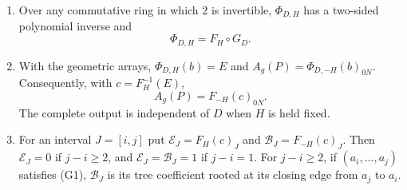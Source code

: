 \begin{lemma}\label{lem:farout}
\begin{enumerate}
\item[(i)] Over any commutative ring in which $2$ is invertible,
$\Phi_{D,H}$ has a two-sided polynomial inverse and
\begin{equation}\label{afr:factor}
\Phi_{D,H}=F_H\circ G_D.
\end{equation}
\item[(ii)] With the geometric arrays, $\Phi_{D,H}(b)=E$ and
$A_g(P)=\Phi_{D,-H}(b)_{0N}$. Consequently, with $c=F_H^{-1}(E)$,
\begin{equation}\label{afr:far-output}
A_g(P)=F_{-H}(c)_{0N}.
\end{equation}
The complete output is independent of $D$ when $H$ is held fixed.
\item[(iii)] For an interval $J=[i,j]$ put
$\mathcal E_J=F_H(c)_J$ and $\mathcal B_J=F_{-H}(c)_J$.
Then $\mathcal E_J=0$ if $j-i\geq2$, and
$\mathcal E_J=\mathcal B_J=1$ if $j-i=1$.
For $j-i\geq2$, if $(a_i,\ldots,a_j)$ satisfies (G1),
$\mathcal B_J$ is its tree coefficient rooted at its closing edge
from $a_j$ to $a_i$.
\end{enumerate}
\end{lemma}
